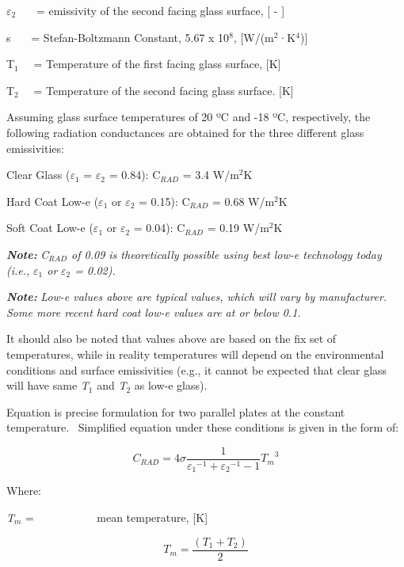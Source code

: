 $\varepsilon$\(_{2}\)~~~ = emissivity of the second facing glass surface, {[} - {]}

s~~~ = Stefan-Boltzmann Constant, 5.67 x 10\(^{8}\), {[}W/(m\(^{2}\)·K\(^{4}\)){]}

T\(_{1}\)~~ = Temperature of the first facing glass surface, {[}K{]}

T\(_{2}\)~~ = Temperature of the second facing glass surface. {[}K{]}

Assuming glass surface temperatures of 20 ºC and -18 ºC, respectively, the following radiation conductances are obtained for the three different glass emissivities:

Clear Glass ($\varepsilon$\(_{1}\) = $\varepsilon$\(_{2}\) = 0.84): C\(_{RAD}\) = 3.4 W/m\(^{2}\)K

Hard Coat Low-e ($\varepsilon$\(_{1}\) or $\varepsilon$\(_{2}\) = 0.15): C\(_{RAD}\) = 0.68 W/m\(^{2}\)K

Soft Coat Low-e ($\varepsilon$\(_{1}\) or $\varepsilon$\(_{2}\) = 0.04): C\(_{RAD}\) = 0.19 W/m\(^{2}\)K

\textbf{\emph{Note:}} \emph{C\(_{RAD}\) of 0.09 is theoretically possible using best low-e technology today (i.e.,} \emph{$\varepsilon$\(_{1}\) or} \emph{$\varepsilon$\(_{2}\) = 0.02).}

\textbf{\emph{Note:}} \emph{Low-e values above are typical values, which will vary by manufacturer.~ Some more recent hard coat low-e values are at or below 0.1.}

It should also be noted that values above are based on the fix set of temperatures, while in reality temperatures will depend on the environmental conditions and surface emissivities (e.g., it cannot be expected that clear glass will have same \emph{T\(_{1}\)} and \emph{T\(_{2}\)} as low-e glass).

Equation is precise formulation for two parallel plates at the constant temperature.~ Simplified equation under these conditions is given in the form of:

\begin{equation}
{C_{RAD}} = 4\sigma \frac{1}{{{\varepsilon_1}^{ - 1} + {\varepsilon_2}^{ - 1} - 1}}{T_m}^3
\end{equation}

Where:

\emph{T\(_{m}\)} = ~~~~~~~~~~ mean temperature, {[}K{]}

\begin{equation}
{T_m} = \frac{{\left( {{T_1} + {T_2}} \right)}}{2}
\end{equation}

